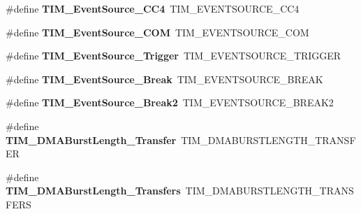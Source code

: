 \begin{DoxyCompactItemize}
\item 
\#define {\bfseries T\+I\+M\+\_\+\+Event\+Source\+\_\+\+C\+C4}~T\+I\+M\+\_\+\+E\+V\+E\+N\+T\+S\+O\+U\+R\+C\+E\+\_\+\+C\+C4\hypertarget{group___h_a_l___t_i_m___aliased___defines_gab60e3190e6c09d2d067f2c689d614979}{}\label{group___h_a_l___t_i_m___aliased___defines_gab60e3190e6c09d2d067f2c689d614979}

\item 
\#define {\bfseries T\+I\+M\+\_\+\+Event\+Source\+\_\+\+C\+OM}~T\+I\+M\+\_\+\+E\+V\+E\+N\+T\+S\+O\+U\+R\+C\+E\+\_\+\+C\+OM\hypertarget{group___h_a_l___t_i_m___aliased___defines_ga4c06981037fae91786f966aa9b4b3435}{}\label{group___h_a_l___t_i_m___aliased___defines_ga4c06981037fae91786f966aa9b4b3435}

\item 
\#define {\bfseries T\+I\+M\+\_\+\+Event\+Source\+\_\+\+Trigger}~T\+I\+M\+\_\+\+E\+V\+E\+N\+T\+S\+O\+U\+R\+C\+E\+\_\+\+T\+R\+I\+G\+G\+ER\hypertarget{group___h_a_l___t_i_m___aliased___defines_ga24835bf5eac25eed90069208dce22564}{}\label{group___h_a_l___t_i_m___aliased___defines_ga24835bf5eac25eed90069208dce22564}

\item 
\#define {\bfseries T\+I\+M\+\_\+\+Event\+Source\+\_\+\+Break}~T\+I\+M\+\_\+\+E\+V\+E\+N\+T\+S\+O\+U\+R\+C\+E\+\_\+\+B\+R\+E\+AK\hypertarget{group___h_a_l___t_i_m___aliased___defines_gad6f9b5366d93c73ff005273c50c9f00a}{}\label{group___h_a_l___t_i_m___aliased___defines_gad6f9b5366d93c73ff005273c50c9f00a}

\item 
\#define {\bfseries T\+I\+M\+\_\+\+Event\+Source\+\_\+\+Break2}~T\+I\+M\+\_\+\+E\+V\+E\+N\+T\+S\+O\+U\+R\+C\+E\+\_\+\+B\+R\+E\+A\+K2\hypertarget{group___h_a_l___t_i_m___aliased___defines_ga18fcfb87d3361c3118e7251d5a99b92a}{}\label{group___h_a_l___t_i_m___aliased___defines_ga18fcfb87d3361c3118e7251d5a99b92a}

\item 
\#define {\bfseries T\+I\+M\+\_\+\+D\+M\+A\+Burst\+Length\+\_\+Transfer}~T\+I\+M\+\_\+\+D\+M\+A\+B\+U\+R\+S\+T\+L\+E\+N\+G\+T\+H\+\_\+T\+R\+A\+N\+S\+F\+ER\hypertarget{group___h_a_l___t_i_m___aliased___defines_gab87f91f1c5583b9888cb6bb37fc639e2}{}\label{group___h_a_l___t_i_m___aliased___defines_gab87f91f1c5583b9888cb6bb37fc639e2}

\item 
\#define {\bfseries T\+I\+M\+\_\+\+D\+M\+A\+Burst\+Length\+\_\+Transfers}~T\+I\+M\+\_\+\+D\+M\+A\+B\+U\+R\+S\+T\+L\+E\+N\+G\+T\+H\+\_\+T\+R\+A\+N\+S\+F\+E\+RS\hypertarget{group___h_a_l___t_i_m___aliased___defines_ga829504c3e8c90a9445f6a223bc3034f8}{}\label{group___h_a_l___t_i_m___aliased___defines_ga829504c3e8c90a9445f6a223bc3034f8}


\end{DoxyCompactItemize}
